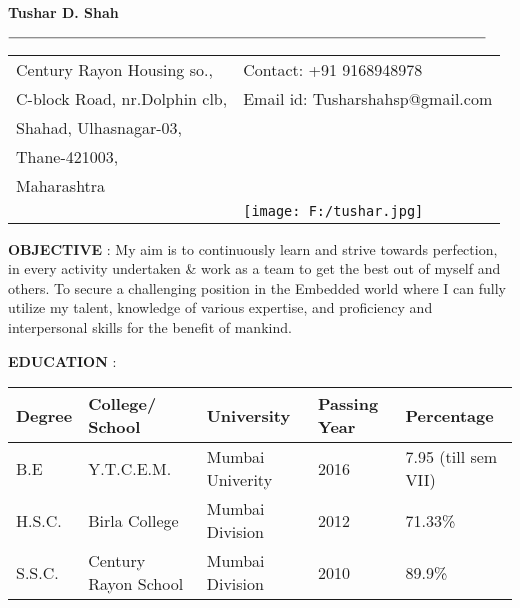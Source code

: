\documentclass{article}
\begin{document}
\begin{center}
  

{\Huge{\textbf{Tushar D. Shah}}}  
  
  \vspace{0.5cm}
$\rule{12cm}{0.15mm}$  

\vspace{0.4cm}
 
   




\begin{tabu} to 1\textwidth {X[l] X[l]}

  Century Rayon Housing so., & Contact: +91 9168948978\\
  C-block Road, nr.Dolphin clb, & Email id: Tusharshahsp@gmail.com \\
  Shahad, Ulhasnagar-03,          &\\
  Thane-421003,&\\
  Maharashtra&\\ 
 & \texttt{[image: F:/tushar.jpg]}


\end{tabu}

 \end{center}
 
 \begin{flushleft}
\textbf{OBJECTIVE} :  My aim is to continuously learn and strive towards perfection, in every activity undertaken \& work as a team to get the best out of myself and others. To secure a challenging position in the Embedded  world where I can fully utilize my talent, knowledge of various expertise, and proficiency and interpersonal skills for the benefit of mankind.
 \end{flushleft}
 
 \begin{flushleft}
 \textbf{EDUCATION} :
 \end{flushleft}
 
 
\begin{center}

\begin{tabu} to 1\textwidth  { | X[l] | X[l] | X[l] |  X[l] | X[1] | }
 \hline 
 Degree & College/ School & University & Passing Year & Percentage\\
 \hline \hline
 B.E  & Y.T.C.E.M. & Mumbai Univerity & 2016 & 7.95 (till sem VII) \\
\hline
H.S.C. & Birla College & Mumbai Division & 2012 & 71.33\% \\
\hline
S.S.C. & Century Rayon School & Mumbai Division & 2010 & 89.9\% \\
\hline
\end{tabu}

\end{center}
\end{document}
